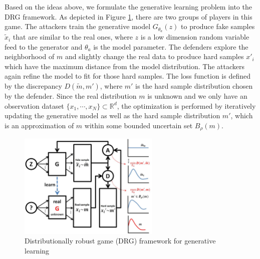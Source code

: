 \documentclass{article}
\begin{document}
Based on the ideas above, we formulate the generative learning problem into the DRG framework. As depicted in Figure \ref{fig:DRGmodel}, there are two groups of players in this game. The attackers train the generative model $G_{\theta_a}(z)$ to produce fake samples $\tilde{x}_i$ that are similar to the real ones, where $z$ is a low dimension random variable feed to the generator and $\theta_a$ is the model parameter. The defenders explore the neighborhood of $m$ and slightly change the real data to produce hard samples $x'_i$ which have the maximum distance from the model distribution. The attackers again refine the model to fit for those hard samples. The loss function is defined by the discrepancy $D(\tilde{m}, m')$, where $m'$ is the hard sample distribution chosen by the defender. Since the real distribution $m$ is unknown and we only have an observation dataset $\{ x_1, \cdots, x_N \} \subset \mathbb{R}^d$, the optimization is performed by iteratively updating the generative model as well as the hard sample distribution $m'$, which is an approximation of $m$ within some bounded uncertain set $B_\rho(m)$.

\begin{figure}[htb!]
\centering
\includegraphics[width=0.6\textwidth]{FIGDRG/w4}
\caption{Distributionally robust game (DRG) framework for generative learning}
\label{fig:DRGmodel}
\end{figure}
\end{document}
